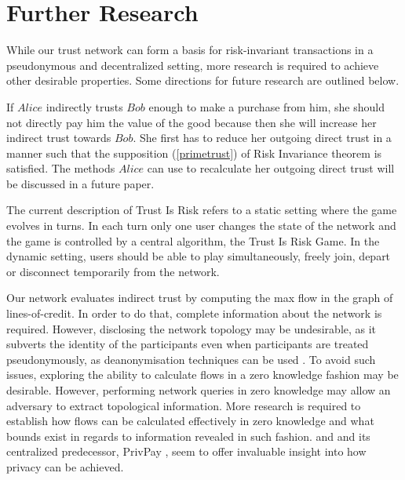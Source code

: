 \section{Further Research}

  While our trust network can form a basis for risk-invariant transactions in a pseudonymous and decentralized setting, more
  research is required to achieve other desirable properties. Some directions for future research are outlined below.

  If $Alice$ indirectly trusts $Bob$ enough to make a purchase from him, she should not directly pay him the value of the
  good because then she will increase her indirect trust towards $Bob$. She first has to reduce her outgoing direct trust in
  a manner such that the supposition (\ref{primetrust}) of Risk Invariance theorem is satisfied. The methods $Alice$ can use
  to recalculate her outgoing direct trust will be discussed in a future paper.

  The current description of Trust Is Risk refers to a static setting where the game evolves in turns. In each turn only one
  user changes the state of the network and the game is controlled by a central algorithm, the Trust Is Risk Game. In the
  dynamic setting, users should be able to play simultaneously, freely join, depart or disconnect temporarily from the
  network.

  Our network evaluates indirect trust by computing the max flow in the graph of lines-of-credit. In order to do that,
  complete information about the network is required. However, disclosing the network topology may be undesirable, as
  it subverts the identity of the participants even when participants are treated pseudonymously, as deanonymisation
  techniques can be used \cite{deanonymisation}. To avoid such issues, exploring the ability to calculate flows in a
  zero knowledge fashion may be desirable. However, performing network queries in zero knowledge may allow an adversary
  to extract topological information. More research is required to establish how flows can be calculated effectively in
  zero knowledge and what bounds exist in regards to information revealed in such fashion. \cite{silentwhispers} and
  and its centralized predecessor, PrivPay \cite{privpay}, seem to offer invaluable insight into how privacy can be achieved.

